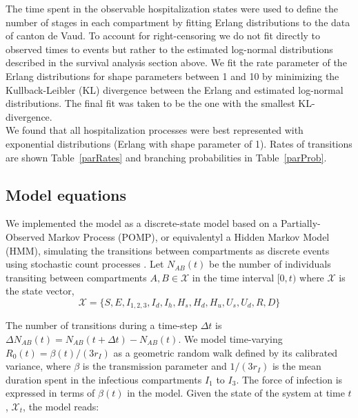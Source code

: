 The time spent in the observable hospitalization states were used to define the number of stages in each compartment by fitting Erlang distributions to the data of canton de Vaud. To account for right-censoring we do not fit directly to observed times to events but rather to the estimated log-normal distributions described in the survival analysis section above. We fit the rate parameter of the Erlang distributions for shape parameters between 1 and 10 by minimizing the Kullback-Leibler (KL) divergence between the Erlang and estimated log-normal distributions. The final fit was taken to be the one with the smallest KL-divergence. \\


We found that all hospitalization processes were best represented with exponential distributions (Erlang with shape parameter of 1). Rates of transitions are shown Table~\ref{parRates} and branching probabilities in Table~\ref{parProb}.

\subsection{Model equations}\label{sec:stoch}
We implemented the model as a discrete-state model based on a Partially-Observed Markov Process (POMP), or equivalentyl a Hidden Markov Model (HMM), simulating the transitions between compartments as discrete events using stochastic count processes \cite{king_inapparent_2008, breto_time_2009}. Let \(N_{AB}(t)\) be the number of individuals transiting between compartments \(A,B\in \mathcal{X}\) in the time interval \([0,t)\)  where $\mathcal{X}$ is the state vector,
$$\mathcal{X} = \{S, E, I_{1,2,3} , I_d, I_h, H_{s}, H_{d}, H_{u}, U_{s}, U_{d}, R, D\}$$

The number of transitions during a time-step $\Delta t$ is
\(\Delta N_{AB}(t) = N_{AB}(t+\Delta t) - N_{AB}(t)\). We model time-varying $R_0(t) = \beta(t)/(3r_I)$ as a geometric random walk defined by its calibrated variance, where $\beta$ is the transmission parameter and $1/(3r_I)$ is the mean duration spent in the infectious compartments $I_1$ to $I_3$. The force of infection is expressed in terms of $\beta(t)$ in the model. Given the state of the system at time \(t\), \(\mathcal{X}_t\), the model reads:

